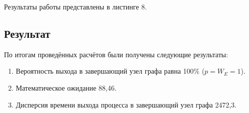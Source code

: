 Результаты работы представлены в листинге 8.



\subsection{Результат}

По итогам проведённых расчётов были получены следующие результаты:
\begin{enumerate}
	\item Вероятность выхода в завершающий узел графа равна 100\% ($p=W_E=1$).
	\item Математическое ожидание 88,46.
	\item Дисперсия времени выхода процесса в завершающий узел графа 2472,3.
\end{enumerate}
